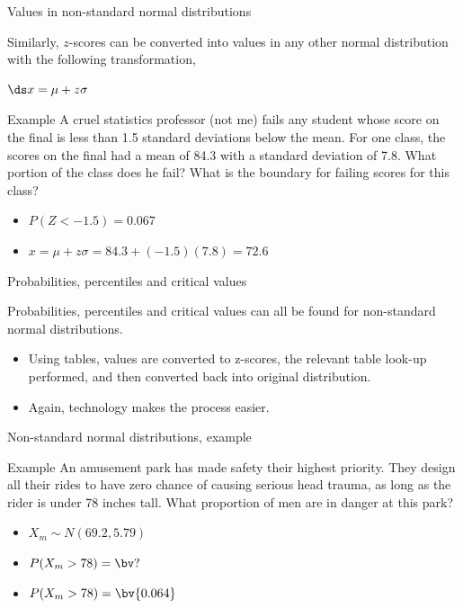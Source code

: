 \documentclass[xcolor=table, handout]{beamer}
\begin{document}
\begin{frame}{Values in non-standard normal distributions}
\begin{block}{}
Similarly, $z$-scores can be converted into values in any other normal distribution with the following transformation,\\
\smallskip
{\centering
$\ds x = \mu + z \sigma$
\par}
\medskip
\end{block}

\pause
\begin{exampleblock}{Example}
A cruel statistics professor (not me) fails any student whose score on the final is less than 1.5 standard deviations below the mean. For one class, the scores on the final had a mean of 84.3 with a standard deviation of 7.8. What portion of the class does he fail? What is the boundary for failing scores for this class?
\begin{itemize}
\pause\item $P(Z < -1.5) = 0.067$
\pause\item $x = \mu + z \sigma = 84.3 + (-1.5) (7.8) = 72.6$
\end{itemize} 
\end{exampleblock}
\end{frame}

\begin{frame}{Probabilities, percentiles and critical values}
\begin{block}{}
Probabilities, percentiles and critical values can all be found for non-standard normal distributions.
\begin{itemize}
\item Using tables, values are converted to z-scores, the relevant table look-up performed, and then converted back into original distribution.
\item Again, technology makes the process easier.
\end{itemize}
\end{block}
\end{frame}


\begin{frame}{Non-standard normal distributions, example}
\begin{exampleblock}{Example}
An amusement park has made safety their highest priority. They design all their rides to have zero chance of causing serious head trauma, as long as the rider is under 78 inches tall. What proportion of men are in danger at this park?
\begin{itemize}
\pause\item $X_m \sim N(69.2, 5.79)$
\pause\item $P(X_m > 78) = \bv ?$
\pause\item $P(X_m > 78) = \bv{0.064}$
\end{itemize}

\end{exampleblock}
\end{frame}
\end{document}
